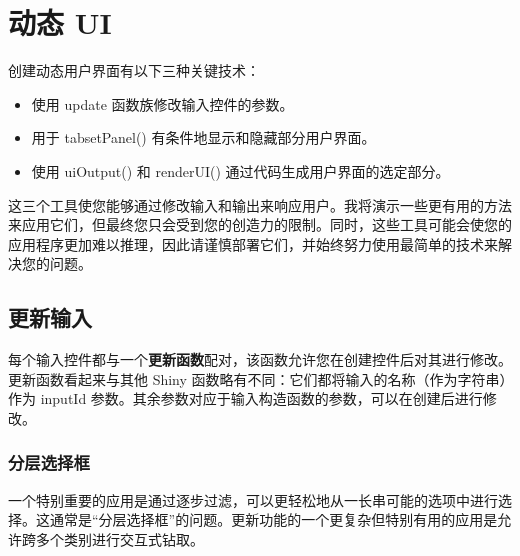 \chapter{动态 UI\label{ch10}}
创建动态用户界面有以下三种关键技术：
\begin{itemize}
    \item 使用 update 函数族修改输入控件的参数。
    \item 用于 tabsetPanel() 有条件地显示和隐藏部分用户界面。
    \item 使用 uiOutput() 和 renderUI() 通过代码生成用户界面的选定部分。
\end{itemize}

这三个工具使您能够通过修改输入和输出来响应用户。我将演示一些更有用的方法来应用它们，但最终您只会受到您的创造力的限制。同时，这些工具可能会使您的应用程序更加难以推理，因此请谨慎部署它们，并始终努力使用最简单的技术来解决您的问题。
\section{更新输入}
每个输入控件都与一个\textbf{更新函数}配对，该函数允许您在创建控件后对其进行修改。更新函数看起来与其他 Shiny 函数略有不同：它们都将输入的名称（作为字符串）作为 inputId 参数。其余参数对应于输入构造函数的参数，可以在创建后进行修改。

\subsection{分层选择框}
一个特别重要的应用是通过逐步过滤，可以更轻松地从一长串可能的选项中进行选择。这通常是“分层选择框”的问题。更新功能的一个更复杂但特别有用的应用是允许跨多个类别进行交互式钻取。